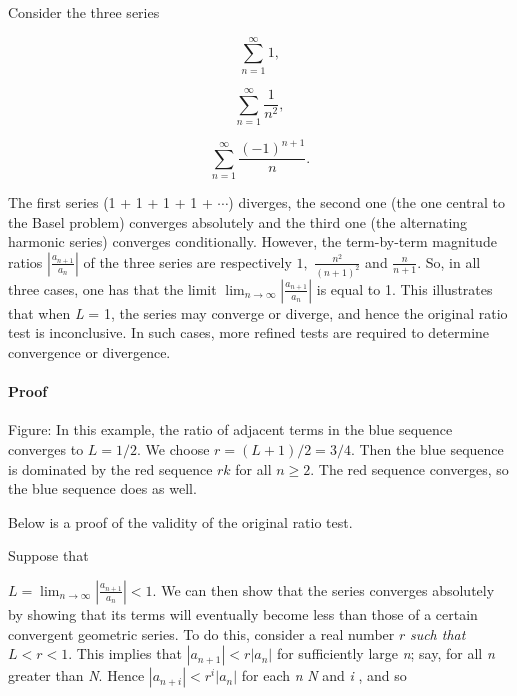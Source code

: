 Consider the three series



$$\sum _{n=1}^\infty 1,$$



$$\sum _{n=1}^\infty \frac{1}{n^2},$$



$$\sum _{n=1}^\infty \frac{(-1)^{n+1}}{n}.$$



The first series (1 + 1 + 1 + 1 + $\cdots$) diverges, the second one (the one central to the Basel problem) converges absolutely and the third one (the alternating harmonic series) converges conditionally. However, the term-by-term magnitude ratios $\left|\frac{a _{n+1}}{a _n}\right|$ of the three series are respectively $1,$ $\frac{n^2}{(n+1)^2}$ and $\frac{n}{n+1}$. So, in all three cases, one has that the limit $\lim _{n\to\infty}\left|\frac{a _{n+1}}{a _n}\right|$ is equal to 1. This illustrates that when \textit{L} = 1, the series may converge or diverge, and hence the original ratio test is inconclusive. In such cases, more refined tests are required to determine convergence or divergence.



\paragraph{Proof}






Figure: In this example, the ratio of adjacent terms in the blue sequence converges to $L=1/2$. We choose $r = (L+1)/2 = 3/4$. Then the blue sequence is dominated by the red sequence $rk$ for all $n \geq 2$. The red sequence converges, so the blue sequence does as well.



Below is a proof of the validity of the original ratio test.



Suppose that

$L = \lim _{n\to\infty} \left| \frac{a _{n+1}}{a _{n}}\right| < 1$. We can then show that the series converges absolutely by showing that its terms will eventually become less than those of a certain convergent geometric series. To do this, consider a real number $r$ \textit{such that} $L < r < 1$. This implies that $|a _{n+1}| < r |a _{n}|$ for sufficiently large \textit{n}; say, for all \textit{n} greater than \textit{N}. Hence $|a _{n+i}| < r^i|a _{n}|$ for each \textit{n} \> \textit{N} and \textit{i} , and so



